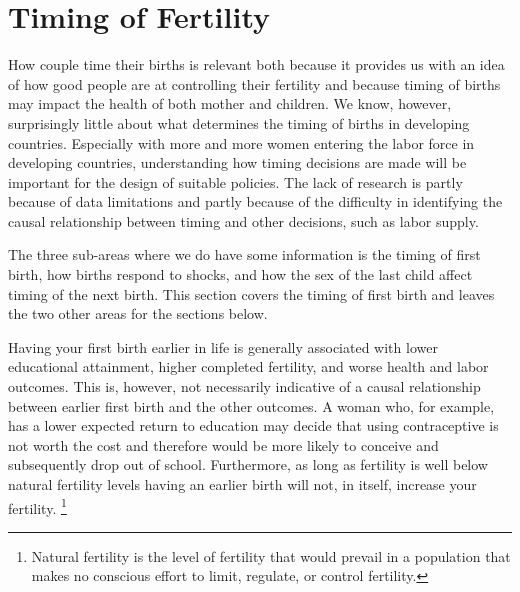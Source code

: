 \documentclass[letterpaper,12pt]{article}
\begin{document}
\section{Timing of Fertility}

How couple time their births is relevant both because it provides
us with an idea of how good people are at controlling their
fertility and because timing of births may impact the health
of both mother and children.
We know, however, surprisingly little about what determines the
timing of births in developing countries.
Especially with more and more women entering the labor force
in developing countries, understanding how timing decisions are made will
be important for the design of suitable policies.
The lack of research is partly because of data limitations and 
partly because of the difficulty in identifying the causal relationship 
between timing and other decisions, such as labor supply.

The three sub-areas where we do have some information is the timing of 
first birth, how births respond to shocks, and how the sex of the 
last child affect timing of the next birth.
This section covers the timing of first birth and leaves the two
other areas for the sections below.

Having your first birth earlier in life is generally associated
with lower educational attainment, higher completed fertility,
and worse health and labor outcomes.
This is, however, not necessarily indicative of a causal
relationship between earlier first birth and the other outcomes.
A woman who, for example, has a lower expected return to education
may decide that using contraceptive is not worth the cost and 
therefore would be more likely to conceive and subsequently
drop out of school.
Furthermore, as long as fertility is well below natural
fertility levels having an earlier birth will not, in itself,
increase your fertility.%
\footnote{
Natural fertility is the level of fertility that would prevail in 
a population that makes no conscious effort to limit, regulate, or 
control fertility.
}
\end{document}
